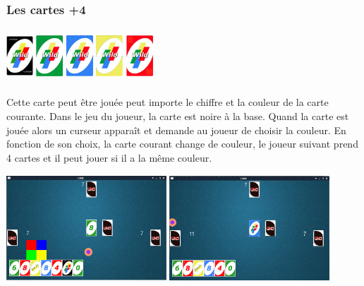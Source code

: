 \documentclass[french]{article}
\begin{document}
\subsubsection{Les cartes +4}
\begin{center}
	\centering
	\includegraphics[width=1cm, height=2cm]{44n}
	\includegraphics[width=1cm, height=2cm]{44v}
	\includegraphics[width=1cm, height=2cm]{44b}
	\includegraphics[width=1cm, height=2cm]{44j}
	\includegraphics[width=1cm, height=2cm]{44r}
\end{center}
Cette carte peut être jouée peut importe le chiffre et la couleur de la carte courante.
Dans le jeu du joueur, la carte est noire à la base. Quand la carte est jouée alors un curseur apparaît et demande au joueur de choisir la couleur. En fonction de son choix, la carte courant change de couleur, le joueur suivant prend 4 cartes et il peut jouer si il a la même couleur.
\begin{center}
	\centering
	\includegraphics[width=6cm, height=4cm]{+4-curseur}
	\includegraphics[width=6cm, height=4cm]{+4-bleu}
\end{center}
\end{document}
